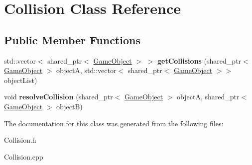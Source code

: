 \hypertarget{class_collision}{}\section{Collision Class Reference}
\label{class_collision}
\subsection*{Public Member Functions}
\begin{DoxyCompactItemize}
\item 
\mbox{\label{class_collision_a326e71d8960461f00b118f1688f61e81}} 
std\+::vector$<$ shared\+\_\+ptr$<$ \mbox{\hyperlink{class_game_object}{Game\+Object}} $>$ $>$ {\bfseries get\+Collisions} (shared\+\_\+ptr$<$ \mbox{\hyperlink{class_game_object}{Game\+Object}} $>$ objectA, std\+::vector$<$ shared\+\_\+ptr$<$ \mbox{\hyperlink{class_game_object}{Game\+Object}} $>$$>$ object\+List)
\item 
\mbox{\label{class_collision_a9af0ec7e3829efcec43bf94e5911f1ae}} 
void {\bfseries resolve\+Collision} (shared\+\_\+ptr$<$ \mbox{\hyperlink{class_game_object}{Game\+Object}} $>$ objectA, shared\+\_\+ptr$<$ \mbox{\hyperlink{class_game_object}{Game\+Object}} $>$ objectB)
\end{DoxyCompactItemize}


The documentation for this class was generated from the following files\+:\begin{DoxyCompactItemize}
\item 
Collision.\+h\item 
Collision.\+cpp\end{DoxyCompactItemize}
